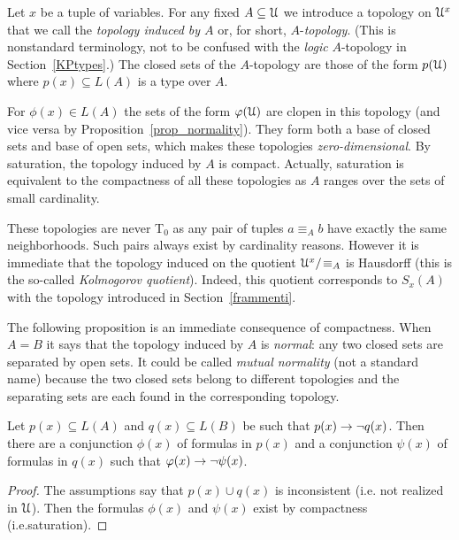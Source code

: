 Let $x$ be a tuple of variables. For any fixed $A\subseteq \EuScript U$ we introduce a topology on $\EuScript U^{x}$ that we call the \emph{topology induced by $A$} or, for short, \emph{$A\mbox{-}$topology}. 
(This is nonstandard terminology, not to be confused with the \textit{logic\/} $A\mbox{-}$topology in Section~\ref{KPtypes}.)
The closed sets of the $A\mbox{-}$topology are those of the form $p(\EuScript U)$ where $p(x)\subseteq L(A)$ is a type over $A$.

For $\phi(x)\in L(A)$ the sets of the form $\varphi(\EuScript U)$ are clopen in this topology (and vice versa by Proposition~\ref{prop_normality}).
They form both a base of closed sets and base of open sets, which makes these topologies \textit{zero-dimensional}.
By saturation, the topology induced by $A$ is compact.
Actually, saturation is equivalent to the compactness of all these topologies as $A$ ranges over the sets of small cardinality.

These topologies are never T$_0$ as any pair of tuples $a\equiv_A b$ have exactly the same neighborhoods. Such pairs always exist by cardinality reasons. However it is immediate that the topology induced on the quotient $\EuScript U^{x}/\!\equiv_A$ is Hausdorff (this is the so-called \textit{Kolmogorov quotient}). Indeed, this quotient corresponds to $S_x(A)$ with the topology introduced in Section~\ref{frammenti}.

The following proposition is an immediate consequence of compactness. When $A=B$ it says that the topology induced by $A$ is \textit{normal}: any two closed sets are separated by open sets. It could be called \emph{mutual normality\/} (not a standard name) because the two closed sets belong to different topologies and the separating sets are each found in the corresponding topology.


\begin{proposition}\label{prop_normality}
Let $p(x)\subseteq L(A)$ and $q(x)\subseteq L(B)$ be such that $p(x)\rightarrow \neg q(x)$.
Then there are a conjunction $\phi(x)$ of formulas in $p(x)$ and a conjunction $\psi(x)$ of formulas in $q(x)$ such that $\varphi(x)\rightarrow\neg\psi(x)$.
\end{proposition}

\begin{proof}
The assumptions say that $p(x)\cup q(x)$ is inconsistent (i.e. not realized in $\EuScript U$). Then the formulas $\phi(x)$ and $\psi(x)$ exist by compactness (i.e.\@ saturation).
\end{proof}


